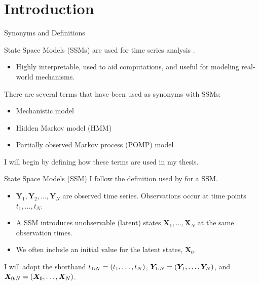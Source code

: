 \documentclass[aspectratio=169]{beamer}\usepackage[]{graphicx}\usepackage[]{xcolor}
\begin{document}
\section{Introduction}

\begin{frame}{Synonyms and Definitions}

State Space Models (SSMs) are used for time series analysis \citep{durbin12}.

\begin{itemize}
  \item Highly interpretable, used to aid computations, and useful for modeling real-world mechanisms.
\end{itemize}

There are several terms that have been used as synonyms with SSMs:

\begin{itemize}
  \item Mechanistic model
  \item Hidden Markov model (HMM)
  \item Partially observed Markov process (POMP) model
\end{itemize}

I will begin by defining how these terms are used in my thesis.

\end{frame}

\begin{frame}{State Space Models (SSM)}
  I follow the definition used by \citet{durbin12} for a SSM.
  
  \begin{itemize}
  \item $\bm{Y}_{1}, \bm{Y}_2, \ldots, \bm{Y}_{N}$ are observed time series. 
  Observations occur at time points $t_1, \ldots, t_N$. 
  \item A SSM introduces unobservable (latent) states $\bm{X}_1, \ldots, \bm{X}_N$ at the same observation times.
  \item We often include an initial value for the latent states, $\bm{X}_0$.
  \end{itemize}
  
  I will adopt the shorthand $t_{{1}:{N}} = (t_1, \ldots, t_N)$, $\bm{Y}_{{1}:{N}} = (\bm{Y}_{1}, \ldots, \bm{Y}_{N})$, and $\bm{X}_{{0}:{N}} = (\bm{X}_0, \ldots, \bm{X}_N)$.

\end{frame}
\end{document}
